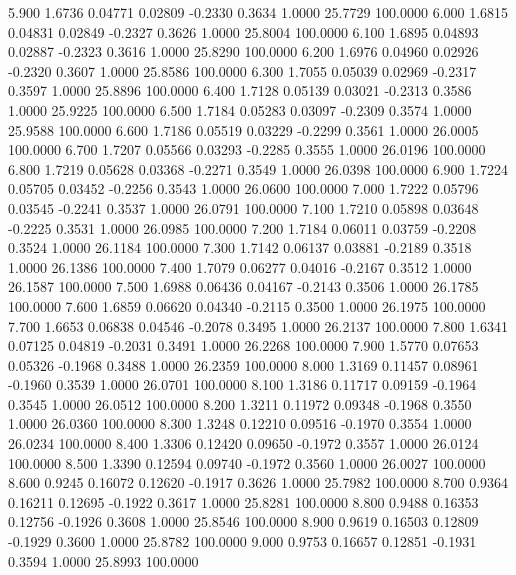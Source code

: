    5.900   1.6736   0.04771   0.02809  -0.2330   0.3634   1.0000  25.7729 100.0000
   6.000   1.6815   0.04831   0.02849  -0.2327   0.3626   1.0000  25.8004 100.0000
   6.100   1.6895   0.04893   0.02887  -0.2323   0.3616   1.0000  25.8290 100.0000
   6.200   1.6976   0.04960   0.02926  -0.2320   0.3607   1.0000  25.8586 100.0000
   6.300   1.7055   0.05039   0.02969  -0.2317   0.3597   1.0000  25.8896 100.0000
   6.400   1.7128   0.05139   0.03021  -0.2313   0.3586   1.0000  25.9225 100.0000
   6.500   1.7184   0.05283   0.03097  -0.2309   0.3574   1.0000  25.9588 100.0000
   6.600   1.7186   0.05519   0.03229  -0.2299   0.3561   1.0000  26.0005 100.0000
   6.700   1.7207   0.05566   0.03293  -0.2285   0.3555   1.0000  26.0196 100.0000
   6.800   1.7219   0.05628   0.03368  -0.2271   0.3549   1.0000  26.0398 100.0000
   6.900   1.7224   0.05705   0.03452  -0.2256   0.3543   1.0000  26.0600 100.0000
   7.000   1.7222   0.05796   0.03545  -0.2241   0.3537   1.0000  26.0791 100.0000
   7.100   1.7210   0.05898   0.03648  -0.2225   0.3531   1.0000  26.0985 100.0000
   7.200   1.7184   0.06011   0.03759  -0.2208   0.3524   1.0000  26.1184 100.0000
   7.300   1.7142   0.06137   0.03881  -0.2189   0.3518   1.0000  26.1386 100.0000
   7.400   1.7079   0.06277   0.04016  -0.2167   0.3512   1.0000  26.1587 100.0000
   7.500   1.6988   0.06436   0.04167  -0.2143   0.3506   1.0000  26.1785 100.0000
   7.600   1.6859   0.06620   0.04340  -0.2115   0.3500   1.0000  26.1975 100.0000
   7.700   1.6653   0.06838   0.04546  -0.2078   0.3495   1.0000  26.2137 100.0000
   7.800   1.6341   0.07125   0.04819  -0.2031   0.3491   1.0000  26.2268 100.0000
   7.900   1.5770   0.07653   0.05326  -0.1968   0.3488   1.0000  26.2359 100.0000
   8.000   1.3169   0.11457   0.08961  -0.1960   0.3539   1.0000  26.0701 100.0000
   8.100   1.3186   0.11717   0.09159  -0.1964   0.3545   1.0000  26.0512 100.0000
   8.200   1.3211   0.11972   0.09348  -0.1968   0.3550   1.0000  26.0360 100.0000
   8.300   1.3248   0.12210   0.09516  -0.1970   0.3554   1.0000  26.0234 100.0000
   8.400   1.3306   0.12420   0.09650  -0.1972   0.3557   1.0000  26.0124 100.0000
   8.500   1.3390   0.12594   0.09740  -0.1972   0.3560   1.0000  26.0027 100.0000
   8.600   0.9245   0.16072   0.12620  -0.1917   0.3626   1.0000  25.7982 100.0000
   8.700   0.9364   0.16211   0.12695  -0.1922   0.3617   1.0000  25.8281 100.0000
   8.800   0.9488   0.16353   0.12756  -0.1926   0.3608   1.0000  25.8546 100.0000
   8.900   0.9619   0.16503   0.12809  -0.1929   0.3600   1.0000  25.8782 100.0000
   9.000   0.9753   0.16657   0.12851  -0.1931   0.3594   1.0000  25.8993 100.0000
